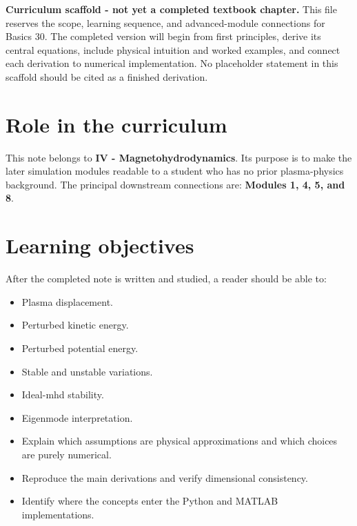 \documentclass[11pt]{article}
\begin{document}

\begin{overviewbox}
\textbf{Curriculum scaffold - not yet a completed textbook chapter.} This file reserves the scope, learning sequence, and advanced-module connections for Basics 30. The completed version will begin from first principles, derive its central equations, include physical intuition and worked examples, and connect each derivation to numerical implementation. No placeholder statement in this scaffold should be cited as a finished derivation.
\end{overviewbox}

\ProjectTOC

\section{Role in the curriculum}
This note belongs to \textbf{IV - Magnetohydrodynamics}. Its purpose is to make the later simulation modules readable to a student who has no prior plasma-physics background. The principal downstream connections are: \textbf{Modules 1, 4, 5, and 8}.

\section{Learning objectives}
After the completed note is written and studied, a reader should be able to:
\begin{itemize}[leftmargin=1.6em]
\item Plasma displacement.
\item Perturbed kinetic energy.
\item Perturbed potential energy.
\item Stable and unstable variations.
\item Ideal-mhd stability.
\item Eigenmode interpretation.
\item Explain which assumptions are physical approximations and which choices are purely numerical.
\item Reproduce the main derivations and verify dimensional consistency.
\item Identify where the concepts enter the Python and MATLAB implementations.
\end{itemize}
\end{document}
